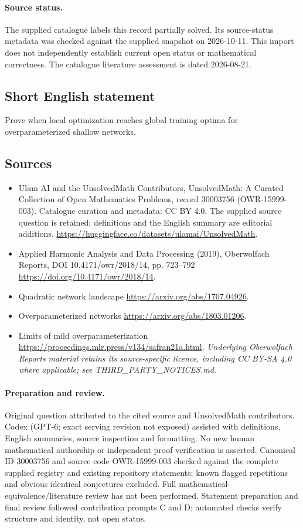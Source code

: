 \documentclass[11pt]{article}
\begin{document}
\paragraph{Source status.}
The supplied catalogue labels this record partially solved. Its source-status metadata was checked against the supplied snapshot on 2026-10-11. This import does not independently establish current open status or mathematical correctness. The catalogue literature assessment is dated 2026-08-21.
\subsection{Short English statement}
Prove when local optimization reaches global training optima for overparameterized shallow networks.
\subsection{Sources}
\begin{itemize}
\item[\hypertarget{source:30003756:1}{S1}] Ulam AI and the UnsolvedMath Contributors, UnsolvedMath: A Curated Collection of Open Mathematics Problems, record 30003756 (OWR-15999-003). Catalogue curation and metadata: CC BY 4.0. The supplied source question is retained; definitions and the English summary are editorial additions.
\url{https://huggingface.co/datasets/ulamai/UnsolvedMath}.
\item[\hypertarget{source:30003756:2}{S2}] Applied Harmonic Analysis and Data Processing (2019), Oberwolfach Reports, DOI 10.4171/owr/2018/14, pp. 723--792
\url{https://doi.org/10.4171/owr/2018/14}.
\item[\hypertarget{source:30003756:3}{S3}] Quadratic network landscape
\url{https://arxiv.org/abs/1707.04926}.
\item[\hypertarget{source:30003756:4}{S4}] Overparameterized networks
\url{https://arxiv.org/abs/1803.01206}.
\item[\hypertarget{source:30003756:5}{S5}] Limits of mild overparameterization
\url{https://proceedings.mlr.press/v134/safran21a.html}.
\textit{Underlying Oberwolfach Reports material retains its source-specific licence, including CC BY-SA 4.0 where applicable; see THIRD\_PARTY\_NOTICES.md.}
\end{itemize}
\paragraph{Preparation and review.}
Original question attributed to the cited source and UnsolvedMath contributors. Codex (GPT-6; exact serving revision not exposed) assisted with definitions, English summaries, source inspection and formatting. No new human mathematical authorship or independent proof verification is asserted. Canonical ID 30003756 and source code OWR-15999-003 checked against the complete supplied registry and existing repository statements; known flagged repetitions and obvious identical conjectures excluded. Full mathematical-equivalence/literature review has not been performed. Statement preparation and final review followed contribution prompts C and D; automated checks verify structure and identity, not open status.
\label{end:30003756}
\end{document}
